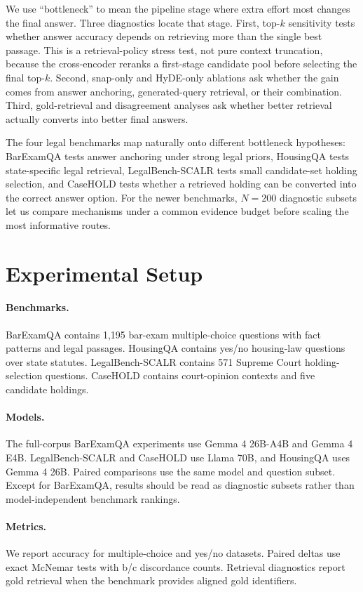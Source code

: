 \documentclass{article}
\begin{document}
We use ``bottleneck'' to mean the pipeline stage where extra effort most changes
the final answer. Three diagnostics locate that stage. First, top-$k$
sensitivity tests whether answer accuracy depends on retrieving more than the
single best passage. This is a retrieval-policy stress test, not pure context
truncation, because the cross-encoder reranks a first-stage candidate pool
before selecting the final top-$k$. Second, snap-only and HyDE-only ablations
ask whether the gain comes from answer anchoring, generated-query retrieval, or
their combination. Third, gold-retrieval and disagreement analyses ask whether
better retrieval actually converts into better final answers.

The four legal benchmarks map naturally onto different bottleneck hypotheses:
BarExamQA tests answer anchoring under strong legal priors, HousingQA tests
state-specific legal retrieval, LegalBench-SCALR tests small
candidate-set holding selection, and CaseHOLD tests whether a retrieved
holding can be converted into the correct answer option. For the newer
benchmarks, $N=200$ diagnostic subsets let us compare mechanisms under a
common evidence budget before scaling the most informative routes.

\section{Experimental Setup}

\paragraph{Benchmarks.}
BarExamQA contains 1,195 bar-exam multiple-choice questions with fact patterns
and legal passages. HousingQA contains yes/no housing-law questions over state
statutes. LegalBench-SCALR contains 571 Supreme Court holding-selection
questions. CaseHOLD contains court-opinion contexts and five candidate
holdings.

\paragraph{Models.}
The full-corpus BarExamQA experiments use Gemma 4 26B-A4B and Gemma 4 E4B.
LegalBench-SCALR and CaseHOLD use Llama 70B, and HousingQA uses Gemma 4 26B.
Paired comparisons use the same model and question subset. Except for
BarExamQA, results should be read as diagnostic subsets rather than
model-independent benchmark rankings.

\paragraph{Metrics.}
We report accuracy for multiple-choice and yes/no datasets. Paired deltas use
exact McNemar tests with b/c discordance counts. Retrieval diagnostics report
gold retrieval when the benchmark provides aligned gold identifiers.
\end{document}
